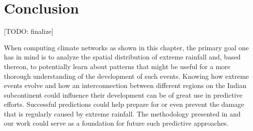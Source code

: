 \section{Conclusion}
\label{st:event_sync_conclusion}
[TODO: finalize]

When computing climate networks as shown in this chapter, the primary goal one has in mind is to analyze the spatial distribution of extreme rainfall and, based thereon, to potentially learn about patterns that might be useful for a more thorough understanding of the development of such events. Knowing how extreme events evolve and how an interconnection between different regions on the Indian subcontinent could influence their development can be of great use in predictive efforts. Successful predictions could help prepare for or even prevent the damage that is regularly caused by extreme rainfall. The methodology presented in \citet{Stolbova.2015} and our work could serve as a foundation for future such predictive approaches.

